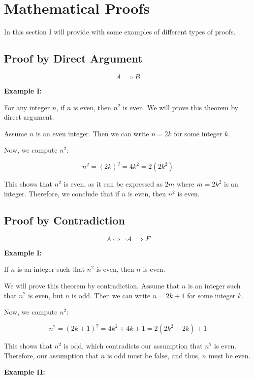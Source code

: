 \newpage
\section{Mathematical Proofs}

In this section I will provide with some examples of different types of proofs.

\subsection{Proof by Direct Argument}

\[
	A \implies B
\]


\textbf{Example I:}

For any integer \(n\), if \(n\) is even, then \( n^2 \) is even.
We will prove this theorem by direct argument.

Assume \(n\) is an even integer. Then we can write \( n = 2k \) for some integer \(k\).

Now, we compute \( n^2 \):

\[		
	n^2 = {(2k)}^2 = 4k^2 = 2(2k^2)
\]
	
This shows that \( n^2 \) is even, as it can be expressed as \( 2m \) where \( m = 2k^2 \) is an integer.
Therefore, we conclude that if \(n\) is even, then \( n^2 \) is even.

\QED

\subsection{Proof by Contradiction}

\[
	A \iff \neg A \implies F
\]

\textbf{Example I:}

If \(n\) is an integer such that \( n^2 \) is even, then \(n\) is even.

We will prove this theorem by contradiction. Assume that \(n\) is an integer such that \( n^2 \) is 
even, but \(n\) is odd. Then we can write \( n = 2k + 1 \) for some integer \(k\).

Now, we compute \( n^2 \):

\[
	n^2 = {(2k + 1)}^2 = 4k^2 + 4k + 1 = 2(2k^2 + 2k) + 1
\]
	
This shows that \( n^2 \) is odd, which contradicts our assumption that \( n^2 \) is even. Therefore, our 
assumption that \(n\) is odd must be false, and thus, \(n\) must be even.

\QED

\textbf{Example II:}

